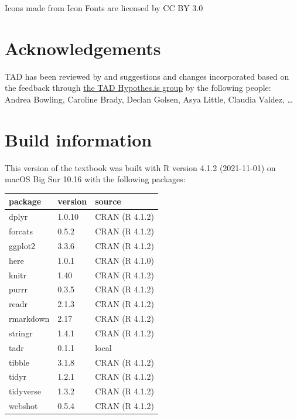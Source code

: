 \documentclass[
  letterpaper,
]{latex/krantz}
\begin{document}
Icons made from Icon Fonts are licensed by CC BY 3.0

\hypertarget{acknowledgements}{%
\section*{Acknowledgements}\label{acknowledgements}}

TAD has been reviewed by and suggestions and changes incorporated based
on the feedback through
\href{https://hypothes.is/groups/Q3o92MJg/tad}{the TAD Hypothes.is
group} by the following people: Andrea Bowling, Caroline Brady, Declan
Golsen, Asya Little, Claudia Valdez, \ldots{}

\hypertarget{build-information}{%
\section*{Build information}\label{build-information}}

This version of the textbook was built with R version 4.1.2 (2021-11-01)
on macOS Big Sur 10.16 with the following packages:

\begin{longtable}[]{@{}lll@{}}
\toprule()
package & version & source \\
\midrule()
\endhead
dplyr & 1.0.10 & CRAN (R 4.1.2) \\
forcats & 0.5.2 & CRAN (R 4.1.2) \\
ggplot2 & 3.3.6 & CRAN (R 4.1.2) \\
here & 1.0.1 & CRAN (R 4.1.0) \\
knitr & 1.40 & CRAN (R 4.1.2) \\
purrr & 0.3.5 & CRAN (R 4.1.2) \\
readr & 2.1.3 & CRAN (R 4.1.2) \\
rmarkdown & 2.17 & CRAN (R 4.1.2) \\
stringr & 1.4.1 & CRAN (R 4.1.2) \\
tadr & 0.1.1 & local \\
tibble & 3.1.8 & CRAN (R 4.1.2) \\
tidyr & 1.2.1 & CRAN (R 4.1.2) \\
tidyverse & 1.3.2 & CRAN (R 4.1.2) \\
webshot & 0.5.4 & CRAN (R 4.1.2) \\
\bottomrule()
\end{longtable}

\end{document}

